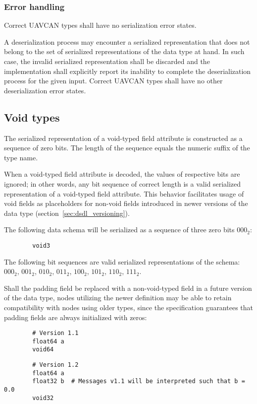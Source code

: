 \subsubsection{Error handling}

Correct UAVCAN types shall have no serialization error states.

A deserialization process may encounter a serialized representation that does not belong to the
set of serialized representations of the data type at hand.
In such case, the invalid serialized representation shall be discarded and the implementation
shall explicitly report its inability to complete the deserialization process for the given input.
Correct UAVCAN types shall have no other deserialization error states.

\subsection{Void types}\label{sec:dsdl_serialized_void}

The serialized representation of a void-typed field attribute is constructed as a sequence of zero bits.
The length of the sequence equals the numeric suffix of the type name.

When a void-typed field attribute is decoded, the values of respective bits are ignored;
in other words, any bit sequence of correct length is a valid serialized representation
of a void-typed field attribute.
This behavior facilitates usage of void fields as placeholders for non-void fields
introduced in newer versions of the data type (section~\ref{sec:dsdl_versioning}).

\begin{remark}
    The following data schema will be serialized as a sequence of three zero bits $000_2$:
    \begin{verbatim}
        void3
    \end{verbatim}
    The following bit sequences are valid serialized representations of the schema:
    $000_2$,
    $001_2$,
    $010_2$,
    $011_2$,
    $100_2$,
    $101_2$,
    $110_2$,
    $111_2$.

    Shall the padding field be replaced with a non-void-typed field in a future version of the data type,
    nodes utilizing the newer definition may be able to retain compatibility with nodes using older types,
    since the specification guarantees that padding fields are always initialized with zeros:

    \begin{verbatim}
        # Version 1.1
        float64 a
        void64
    \end{verbatim}

    \begin{verbatim}
        # Version 1.2
        float64 a
        float32 b  # Messages v1.1 will be interpreted such that b = 0.0
        void32
    \end{verbatim}
\end{remark}

